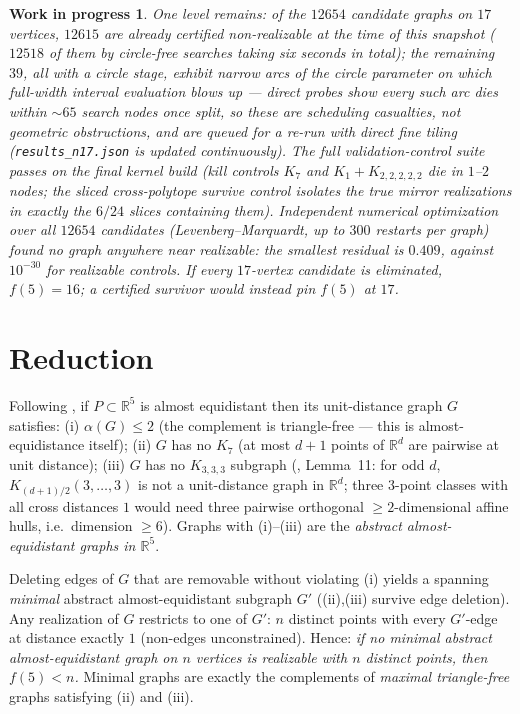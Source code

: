 \documentclass[11pt]{article}
\newtheorem*{wip}{Work in progress}
\newcommand{\R}{\mathbb{R}}
\begin{document}
\begin{wip}
One level remains: of the $12654$ candidate graphs on $17$ vertices,
$12615$ are already certified non-realizable at the time of this snapshot
($12518$ of them by circle-free searches taking six seconds in total);
the remaining $39$, all with a circle stage, exhibit narrow arcs of the
circle parameter on which full-width interval evaluation blows up ---
direct probes show every such arc dies within ${\sim}65$ search nodes
once split, so these are scheduling casualties, not geometric
obstructions, and are queued for a re-run with direct fine tiling
(\texttt{results\_n17.json} is updated continuously). The full
validation-control suite passes on the final kernel build (kill controls
$K_7$ and $K_1{+}K_{2,2,2,2,2}$ die in $1$--$2$ nodes; the sliced
cross-polytope survive control isolates the true mirror realizations in
exactly the $6/24$ slices containing them). Independent
numerical optimization over \emph{all} $12654$ candidates
(Levenberg--Marquardt, up to $300$ restarts per graph) found no graph
anywhere near realizable: the smallest residual is $0.409$, against
$10^{-30}$ for realizable controls. If every $17$-vertex candidate is
eliminated, $f(5)=16$; a certified survivor would instead pin $f(5)$
at $17$.
\end{wip}

\section*{Reduction}

Following \cite{BPSSV}, if $P\subset\R^5$ is almost equidistant then its
unit-distance graph $G$ satisfies: (i) $\alpha(G)\le 2$ (the complement is
triangle-free --- this is almost-equidistance itself); (ii) $G$ has no
$K_7$ (at most $d{+}1$ points of $\R^d$ are pairwise at unit distance);
(iii) $G$ has no $K_{3,3,3}$ subgraph (\cite{BPSSV}, Lemma~11: for odd $d$,
$K_{(d+1)/2}(3,\dots,3)$ is not a unit-distance graph in $\R^d$; three
$3$-point classes with all cross distances $1$ would need three pairwise
orthogonal $\ge2$-dimensional affine hulls, i.e.\ dimension $\ge 6$).
Graphs with (i)--(iii) are the \emph{abstract almost-equidistant graphs in
$\R^5$}.

Deleting edges of $G$ that are removable without violating (i) yields a
spanning \emph{minimal} abstract almost-equidistant subgraph $G'$
((ii),(iii) survive edge deletion). Any realization of $G$ restricts to
one of $G'$: $n$ distinct points with every $G'$-edge at distance exactly
$1$ (non-edges unconstrained). Hence: \emph{if no minimal abstract
almost-equidistant graph on $n$ vertices is realizable with $n$ distinct
points, then $f(5)<n$.} Minimal graphs are exactly the complements of
\emph{maximal triangle-free} graphs satisfying (ii) and (iii).
\end{document}
